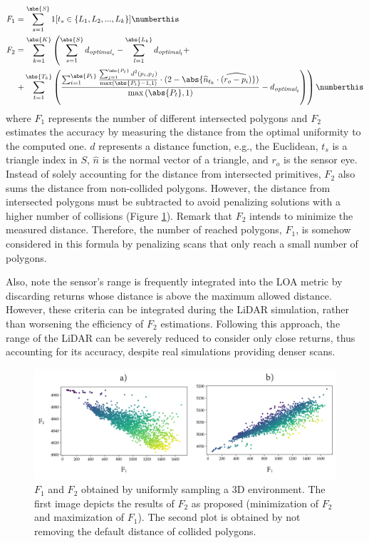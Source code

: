 \begin{align*}
    \textit{F}_{1} &= \sum_{s=1}^{\abs{S}} 1[t_s \in \{L_1, L_2, ..., L_k\}]
    \numberthis \label{eq:metric_count}\\
    \textit{F}_{2} &= \sum_{k=1}^{\abs{K}} \left(\sum_{s=1}^{\abs{S}} d_{\textit{optimal}_{s}} - \sum_{l=1}^{\abs{L_k}} d_{\textit{optimal}_{l}}  +\right.\\ & 
    \left. + \sum_{t=1}^{\abs{T_k}} \left(\frac{\sum_{i=1}^{\abs{P_t}} \frac{\sum_{j=1}^{\abs{P_t}} d^{2}(p_i, p_j)}{\max\left(\abs{P_t} - 1, 1\right)} \cdot (2 - \abs{\widehat{n}_{t_{k}} \cdot \widehat{\left(r_{o} - p_{i}\right)}})}{\max\left(\abs{P_t}, 1\right)} - d_{\textit{optimal}_{t}}\right)\right)
    \numberthis \label{eq:uniformity_error}
\end{align*}
where $F_1$ represents the number of different intersected polygons and $F_2$ estimates the accuracy by measuring the distance from the optimal uniformity to the computed one. $d$ represents a distance function, e.g., the Euclidean, $t_s$ is a triangle index in $S$, $\hat{n}$ is the normal vector of a triangle, and $r_o$ is the sensor eye. Instead of solely accounting for the distance from intersected primitives, $F_2$ also sums the distance from non-collided polygons. However, the distance from intersected polygons must be subtracted to avoid penalizing solutions with a higher number of collisions (Figure \ref{fig:f2_sampling}). Remark that $F_2$ intends to minimize the measured distance. Therefore, the number of reached polygons, $F_1$, is somehow considered in this formula by penalizing scans that only reach a small number of polygons.

Also, note the sensor's range is frequently integrated into the LOA metric by discarding returns whose distance is above the maximum allowed distance. However, these criteria can be integrated during the LiDAR simulation, rather than worsening the efficiency of $F_2$ estimations. Following this approach, the range of the LiDAR can be severely reduced to consider only close returns, thus accounting for its accuracy, despite real simulations providing denser scans. 

\begin{figure}
    \centering
    \includegraphics[width=\linewidth]{figs/lidar_optimization/f2_sampling.png}
	\caption{$F_1$ and $F_2$ obtained by uniformly sampling a 3D environment. The first image depicts the results of $F_2$ as proposed (minimization of $F_2$ and maximization of $F_1$). The second plot is obtained by not removing the default distance of collided polygons.}
	\label{fig:f2_sampling}
\end{figure}

